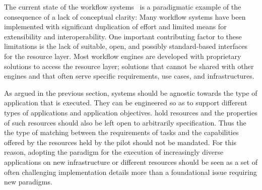 \documentclass{sig-alternate}
\begin{document}
  The current state of the workflow
systems~\cite{taylor2014} is a paradigmatic example of the consequence of a lack
of conceptual clarity: Many workflow systems have been implemented with
significant duplication of effort and limited means for extensibility and
interoperability. One important contributing factor to these limitations is the
lack of suitable, open, and possibly standard-based interfaces for the resource
layer. Most workflow engines are developed with proprietary solutions to access
the resource layer; solutions that cannot be shared with other engines and that
often serve specific requirements, use cases, and infrastructures.





As argued in the previous section, \pilot systems should be agnostic towards the
type of application that is executed. They can be engineered so as to support
different types of applications and application objectives. \pilots hold
resources and the properties of such resources should also be left open to
arbitrarily specification. Thus the the type of matching between the
requirements of tasks and the capabilities offered by the resources held by the
pilot should not be mandated. For this reason, adopting the \pilot paradigm for
the execution of increasingly diverse applications on new infrastructure or
different resources should be seen as a set of often challenging implementation
details more than a foundational issue requiring new paradigms.



\end{document}
